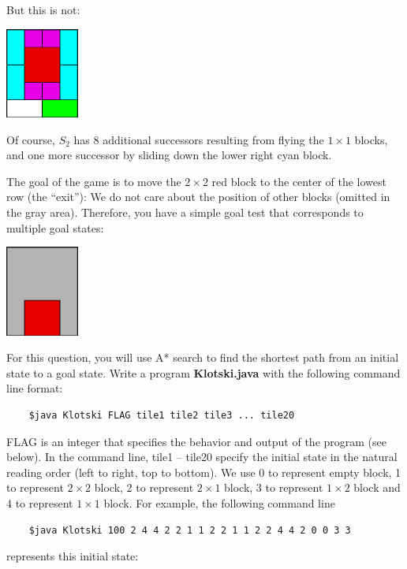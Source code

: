 \documentclass[10pt,a4paper]{article}
\begin{document}
But this is not:

\centerline{\includegraphics[width=0.18\textwidth]{figure_13.eps}}

Of course, $S_2$ has 8 additional successors resulting from flying the $1\times 1$ blocks, and one more successor by sliding down the lower right cyan block.

The goal of the game is to move the $2\times2$ red block to the center of the lowest row (the ``exit''):
We do not care about the position of other blocks (omitted in the gray area).
Therefore, you have a simple goal test that corresponds to multiple goal states:

\centerline{\includegraphics[width=0.18\textwidth]{figure_14.eps}}



For this question, you will use A* search to find the shortest path from an initial state to a goal state. 
Write a program {\bf Klotski.java} with the following command line format:

\begin{verbatim}
    $java Klotski FLAG tile1 tile2 tile3 ... tile20
\end{verbatim}

FLAG is an integer that specifies the behavior and output of the program (see below). 
In the command line, tile1 -- tile20 specify the initial state in the natural reading order (left to right, top to bottom). 
We use 0 to represent empty block, 1 to represent $2\times2$ block, 2 to represent $2\times1$ block, 3 to represent $1\times2$ block and 4 to represent $1\times1$ block.
For example, 
the following command line 

\begin{verbatim}
    $java Klotski 100 2 4 4 2 2 1 1 2 2 1 1 2 2 4 4 2 0 0 3 3
\end{verbatim}

represents this initial state:
\end{document}

